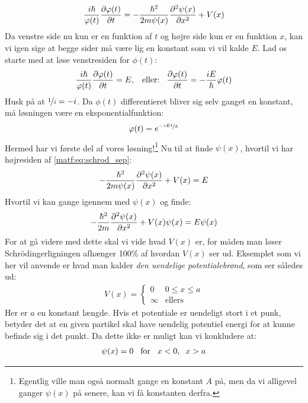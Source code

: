 \documentclass[crop=false, class=memoir]{standalone}
\begin{document}
\begin{align}
    \frac{i\hbar}{\phi(t)}\pdv{\phi(t)}{t} = -\frac{\hbar^2}{2m\psi(x)}\pdv[2]{\psi(x)}{x} + V(x)
    \label{matf:eq:schrod_sep}
\end{align}
Da venstre side nu kun er en funktion af $t$ og højre side kun er en funktion $x$, kan vi igen sige at begge sider må være lig en konstant som vi vil kalde $E$. Lad os starte med at løse venstresiden for $\phi(t)$:
\begin{align}
    \frac{i\hbar}{\phi(t)} \pdv{\phi(t)}{t} = E, \hspace{3mm} \text{eller:} \hspace{3mm} \pdv{\phi(t)}{t} = -\frac{iE}{\hbar}\phi(t)
\end{align}
Husk på at $\nicefrac{1}{i} = -i$. Da $\phi(t)$ differentieret bliver sig selv ganget en konstant, må løsningen være en eksponentialfunktion:
\begin{align}
    \phi(t) = e^{-\nicefrac{iEt}{\hbar}} 
\end{align}
Hermed har vi første del af vores løsning!\footnote{Egentlig ville man også normalt gange en konstant $A$ på, men da vi alligevel ganger $\psi(x)$ på senere, kan vi få konstanten derfra.} Nu til at finde $\psi(x)$, hvortil vi har højresiden af \cref{matf:eq:schrod_sep}:
\begin{align}
    -\frac{\hbar^2}{2m\psi(x)}\pdv[2]{\psi(x)}{x} + V(x) = E
\end{align}
Hvortil vi kan gange igennem med $\psi(x)$ og finde:
\begin{align}
    -\frac{\hbar^2}{2m}\pdv[2]{\psi(x)}{x} + V(x) \psi(x) = E\psi(x)
    \label{matf:eq:1dnotime}
\end{align}
For at gå videre med dette skal vi vide hvad $V(x)$ er, for måden man løser Schrödingerligningen afhænger 100\% af hvordan $V(x)$ ser ud. Eksemplet som vi her vil anvende er hvad man kalder \emph{den uendelige potentialebrønd}, som ser således ud:
\begin{align}
    V(x) =
    \begin{cases} 
      0 &  0 \leq x \leq a \\
      \infty & \text{ellers}
   \end{cases}
\end{align}
Her er $a$ en konstant længde. Hvis et potentiale er uendeligt stort i et punk, betyder det at en given partikel skal have uendelig potentiel energi for at kunne befinde sig i det punkt. Da dette ikke er muligt kan vi konkludere at:
\begin{align}
    \psi(x) = 0 \hspace{3mm} \text{for} \hspace{3mm} x < 0, \hspace{2mm} x > a
\end{align}
\end{document}
